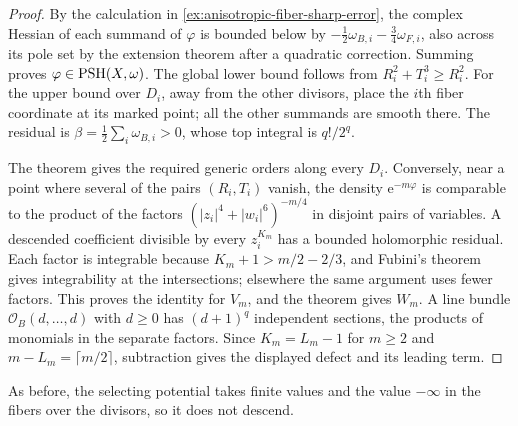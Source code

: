 \begin{proof}
By the calculation in \cref{ex:anisotropic-fiber-sharp-error}, the complex Hessian of each summand of $\varphi$ is bounded below by $-\tfrac12\omega_{B,i}-\tfrac34\omega_{F,i}$, also across its pole set by the extension theorem after a quadratic correction. Summing proves $\varphi\in\mathrm{PSH}(X,\omega)$. The global lower bound follows from $R_i^2+T_i^3\geq R_i^2$. For the upper bound over $D_i$, away from the other divisors, place the $i$th fiber coordinate at its marked point; all the other summands are smooth there. The residual is $\beta=\tfrac12\sum_i\omega_{B,i}>0$, whose top integral is $q!/2^q$.

The theorem gives the required generic orders along every $D_i$. Conversely, near a point where several of the pairs $(R_i,T_i)$ vanish, the density $\mathrm{e}^{-m\varphi}$ is comparable to the product of the factors $(|z_i|^4+|w_i|^6)^{-m/4}$ in disjoint pairs of variables. A descended coefficient divisible by every $z_i^{K_m}$ has a bounded holomorphic residual. Each factor is integrable because $K_m+1>m/2-2/3$, and Fubini's theorem gives integrability at the intersections; elsewhere the same argument uses fewer factors. This proves the identity for $V_m$, and the theorem gives $W_m$. A line bundle $\mathcal O_B(d,\ldots,d)$ with $d\geq0$ has $(d+1)^q$ independent sections, the products of monomials in the separate factors. Since $K_m=L_m-1$ for $m\geq2$ and $m-L_m=\lceil m/2\rceil$, subtraction gives the displayed defect and its leading term.
\end{proof}

As before, the selecting potential takes finite values and the value $-\infty$ in the fibers over the divisors, so it does not descend.


